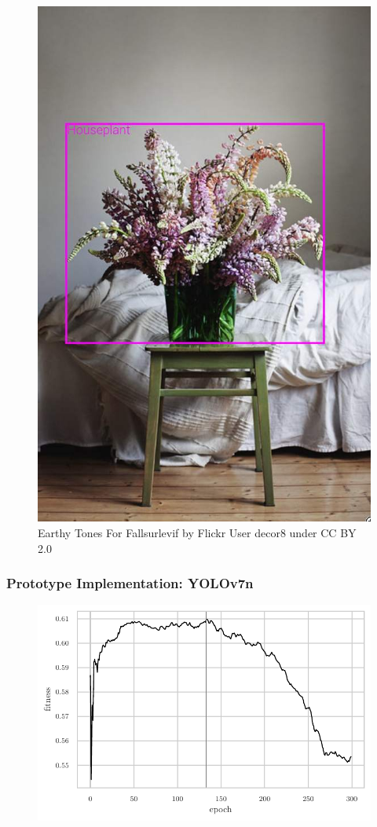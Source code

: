 \documentclass{beamer}
\begin{document}
\begin{frame}
\begin{minipage}[bt]{.49\textwidth}
\begin{figure}
\begin{center}
        \includegraphics[width=.85\textwidth]{graphics/houseplant.jpg}
        \caption{Earthy Tones For Fallsurlevif by Flickr User decor8
          under CC BY 2.0}
      \end{center}
    \end{figure}
  \end{minipage}
\end{frame}

\begin{frame}
  \frametitle{Prototype Implementation: YOLOv7n}
  \begin{figure}[htbp]
    \begin{center}
      \includegraphics[width=\textwidth]{graphics/model_fitness.pdf}
    \end{center}
  \end{figure}
\end{frame}
\end{document}
